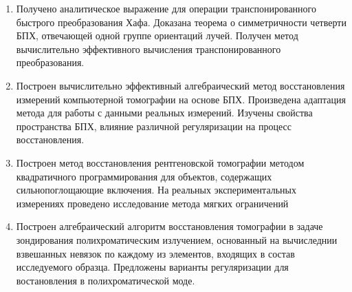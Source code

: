 \begin{enumerate}
  \item Получено аналитическое выражение для операции транспонированного быстрого преобразования Хафа. Доказана теорема о симметричности четверти БПХ, отвечающей одной группе ориентаций лучей. Получен метод вычислительно эффективного вычисления транспонированного преобразования.
  \item Построен вычислительно эффективный алгебраический метод восстановления измерений компьютерной томографии на основе БПХ. Произведена адаптация метода для работы с данными реальных измерений. Изучены свойства пространства БПХ, влияние различной регуляризации на процесс восстановления.
  \item Построен метод восстановления рентгеновской томографии методом квадратичного программирования для объектов, содержащих сильнопоглощающие включения. На реальных экспериментальных измерениях проведено исследование метода мягких ограничений 
  \item Построен алгебраический алгоритм восстановления томографии в задаче зондирования полихроматическим излучением, основанный на вычиследнии взвешанных невязок по каждому из элементов, входящих в состав исследуемого образца. Предложены варианты регуляризации для востановления в полихроматической моде. 
\end{enumerate}
